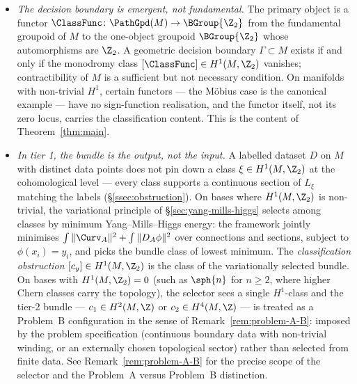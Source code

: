 \begin{itemize}[leftmargin=2em]
\item[(P1)] \textit{The decision boundary is emergent, not fundamental.}
The primary object is a functor
$\ClassFunc \colon \PathGpd(M) \to \BGroup{\Z_2}$ from the fundamental
groupoid of $M$ to the one-object groupoid $\BGroup{\Z_2}$ whose
automorphisms are $\Z_2$. A geometric decision boundary
$\Gamma\subset M$ exists if and only if the monodromy class
$[\ClassFunc]\in H^1(M,\Z_2)$ vanishes; contractibility of $M$ is a
sufficient but not necessary condition. On manifolds with non-trivial
$H^1$, certain functors --- the M\"obius case is the canonical
example --- have no sign-function realisation, and the functor
itself, not its zero locus, carries the classification content. This
is the content of Theorem~\ref{thm:main}.

\item[(P2)] \textit{In tier 1, the bundle is the output, not the
input.} A labelled dataset $D$ on $M$ with distinct data points
does not pin down a class $\xi\in H^1(M,\Z_2)$ at the cohomological
level --- every class supports a continuous section of $L_\xi$
matching the labels (\S\ref{ssec:obstruction}). On bases where
$H^1(M,\Z_2)$ is non-trivial, the variational principle of
\S\ref{sec:yang-mills-higgs} selects among classes by minimum
Yang--Mills--Higgs energy: the framework jointly minimises
$\int\|\Curv_A\|^2 + \int\|D_A\phi\|^2$ over connections and
sections, subject to $\phi(x_i)=y_i$, and picks the bundle class
of lowest minimum. The \emph{classification obstruction}
$[c_y]\in H^1(M,\Z_2)$ is the class of the variationally selected
bundle. On bases with $H^1(M,\Z_2)=0$ (such as $\sph{n}$ for
$n\geq 2$, where higher Chern classes carry the topology), the
selector sees a single $H^1$-class and the tier-2 bundle ---
$c_1\in H^2(M,\Z)$ or $c_2\in H^4(M,\Z)$ --- is treated as a
Problem~B configuration in the sense of
Remark~\ref{rem:problem-A-B}: imposed by the problem
specification (continuous boundary data with non-trivial winding,
or an externally chosen topological sector) rather than selected
from finite data. See Remark~\ref{rem:problem-A-B} for the precise
scope of the selector and the Problem~A versus Problem~B distinction.


\end{itemize}
